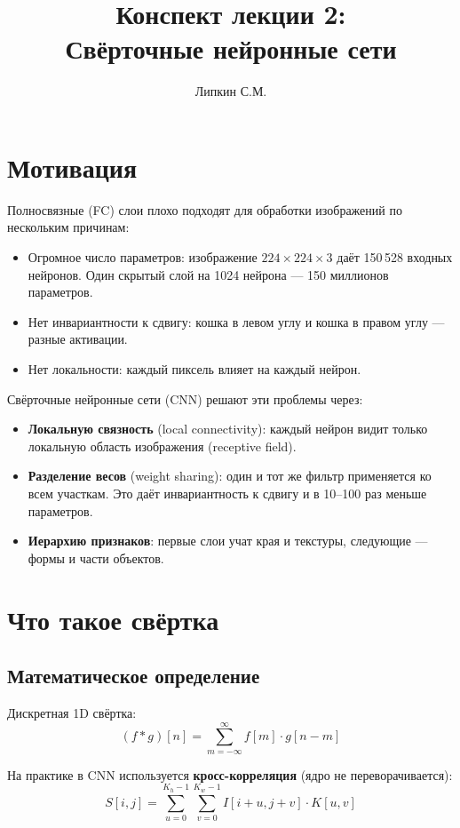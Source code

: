 \documentclass[a4paper,12pt]{article}
\title{Конспект лекции 2: \\ Свёрточные нейронные сети}
\author{Липкин С.М.}
\date{}
\begin{document}
\maketitle

\section{Мотивация}

Полносвязные (FC) слои плохо подходят для обработки изображений по нескольким причинам:
\begin{itemize}
    \item Огромное число параметров: изображение $224 \times 224 \times 3$ даёт 150\,528 входных нейронов. Один скрытый слой на 1024 нейрона — 150 миллионов параметров.
    \item Нет инвариантности к сдвигу: кошка в левом углу и кошка в правом углу — разные активации.
    \item Нет локальности: каждый пиксель влияет на каждый нейрон.
\end{itemize}

Свёрточные нейронные сети (CNN) решают эти проблемы через:
\begin{itemize}
    \item \textbf{Локальную связность} (local connectivity): каждый нейрон видит только локальную область изображения (receptive field).
    \item \textbf{Разделение весов} (weight sharing): один и тот же фильтр применяется ко всем участкам. Это даёт инвариантность к сдвигу и в 10--100 раз меньше параметров.
    \item \textbf{Иерархию признаков}: первые слои учат края и текстуры, следующие — формы и части объектов.
\end{itemize}

\section{Что такое свёртка}

\subsection{Математическое определение}

Дискретная 1D свёртка:
\[
(f * g)[n] = \sum_{m=-\infty}^{\infty} f[m] \cdot g[n-m]
\]

На практике в CNN используется \textbf{кросс-корреляция} (ядро не переворачивается):
\[
S[i,j] = \sum_{u=0}^{K_h-1} \sum_{v=0}^{K_w-1} I[i+u, j+v] \cdot K[u, v]
\]
\end{document}
